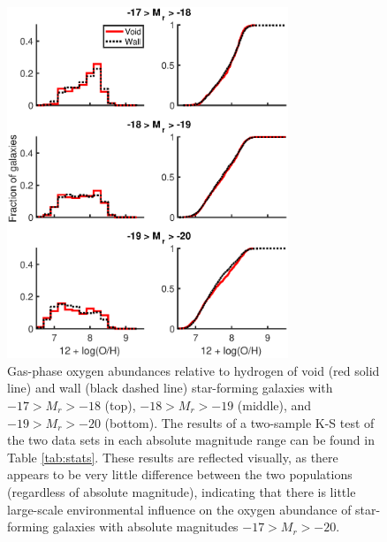\begin{figure}
    \centering
    \includegraphics[width=0.75\textwidth]{Images/Paper2/1sig_17-20_SF_t3_12logOH_stacked}
    \caption[Metallicity distribution of star-forming galaxies with 
    $-17 > M_r > -20$]{Gas-phase oxygen abundances relative to hydrogen of void 
    (red solid line) and wall (black dashed line) star-forming galaxies with 
    $-17 > M_r > -18$ (top), $-18 > M_r > -19$ (middle), and $-19 > M_r > -20$ 
    (bottom).  The results of a two-sample K-S test of the two data sets in each 
    absolute magnitude range can be found in Table \ref{tab:stats}.  These 
    results are reflected visually, as there appears to be very little 
    difference between the two populations (regardless of absolute magnitude), 
    indicating that there is little large-scale environmental influence on the 
    oxygen abundance of star-forming galaxies with absolute magnitudes 
    $-17 > M_r > -20$.}
    \label{fig:Z_bright}
\end{figure}

